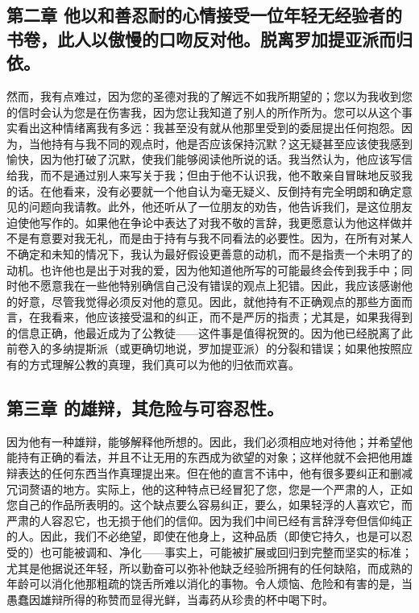 
\subsection{第二章 他以和善忍耐的心情接受一位年轻无经验者的书卷，此人以傲慢的口吻反对他。脱离罗加提亚派而归依。}

然而，我有点难过，因为您的圣德对我的了解远不如我所期望的；您以为我收到您的信时会认为您是在伤害我，因为您让我知道了别人的所作所为。您可以从这个事实看出这种情绪离我有多远：我甚至没有就从他那里受到的委屈提出任何抱怨。因为，当他持有与我不同的观点时，他是否应该保持沉默？这无疑甚至应该使我感到愉快，因为他打破了沉默，使我们能够阅读他所说的话。我当然认为，他应该写信给我，而不是通过别人来写关于我；但由于他不认识我，他不敢亲自冒昧地反驳我的话。在他看来，没有必要就一个他自认为毫无疑义、反倒持有完全明朗和确定意见的问题向我请教。此外，他还听从了一位朋友的劝告，他告诉我们，是这位朋友迫使他写作的。如果他在争论中表达了对我不敬的言辞，我更愿意认为他这样做并不是有意要对我无礼，而是由于持有与我不同看法的必要性。因为，在所有对某人不确定和未知的情况下，我认为最好假设更善意的动机，而不是指责一个未明了的动机。也许他也是出于对我的爱，因为他知道他所写的可能最终会传到我手中；同时他不愿意我在一些他特别确信自己没有错误的观点上犯错。因此，我应该感谢他的好意，尽管我觉得必须反对他的意见。因此，就他持有不正确观点的那些方面而言，在我看来，他应该接受温和的纠正，而不是严厉的指责；尤其是，如果我得到的信息正确，他最近成为了公教徒——这件事是值得祝贺的。因为他已经脱离了此前卷入的多纳提斯派（或更确切地说，罗加提亚派）的分裂和错误；如果他按照应有的方式理解公教的真理，我们真可以为他的归依而欢喜。\par


\subsection{第三章 的雄辩，其危险与可容忍性。}

因为他有一种雄辩，能够解释他所想的。因此，我们必须相应地对待他；并希望他能持有正确的看法，并且不让无用的东西成为欲望的对象；这样他就不会把他用雄辩表达的任何东西当作真理提出来。但在他的直言不讳中，他有很多要纠正和删减冗词赘语的地方。实际上，他的这种特点已经冒犯了您，您是一个严肃的人，正如您自己的作品所表明的。这个缺点要么容易纠正，要么，如果轻浮的人喜欢它，而严肃的人容忍它，也无损于他们的信仰。因为我们中间已经有言辞浮夸但信仰纯正的人。因此，我们不必绝望，即使在他身上，这种品质（即使它持久，也是可以忍受的）也可能被调和、净化——事实上，可能被扩展或回归到完整而坚实的标准；尤其是他据说还年轻，所以勤奋可以弥补他缺乏经验所拥有的任何缺陷，而成熟的年龄可以消化他那粗疏的饶舌所难以消化的事物。令人烦恼、危险和有害的是，当愚蠢因雄辩所得的称赞而显得光鲜，当毒药从珍贵的杯中喝下时。\par

